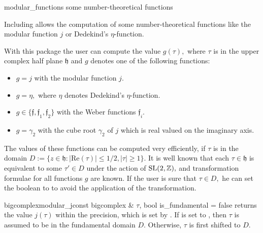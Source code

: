 

\NAME

modular\_functions \dotfill some number-theoretical functions



\ABSTRACT

Including  allows the computation of some
number-theoretical functions like the modular function $j$ or
Dedekind's $\eta$-function.



\DESCRIPTION

With this package the user can compute the
value $g(\tau),$ where $\tau$ is in the upper complex half plane
$\mathfrak{h}$ and $g$ denotes one of the following functions:

\begin{itemize}
\item $g=j$ with the modular function $j.$
\item $g=\eta,$ where $\eta$ denotes Dedekind's $\eta$-function.
\item $g\in\{\mathfrak{f},\mathfrak{f}_1,\mathfrak{f}_2\}$ with the
Weber functions $\mathfrak{f}_i.$
\item $g=\gamma_2$ with the cube root $\gamma_2$ of $j$ which is real
valued on the imaginary axis.
\end{itemize}

The values of these functions can be computed very efficiently, if
$\tau$ is in the domain
$D:=\{z\in\mathfrak{h}: |\mathrm{Re}(\tau)|\leq 1/2, |\tau|\geq 1\}.$
It is well known that each $\tau\in\mathfrak{h}$ is equivalent to some
$\tau'\in D$ under the action of $\mathrm{SL}(2,\mathbb{Z}),$
and transformation formulae for all functions $g$ are known. If
the user is sure that $\tau\in D,$ he can set the boolean
 to  to avoid the application
of the transformation.

\begin{fcode}{bigcomplex}{modular_j}{const bigcomplex & $\tau$, bool is_fundamental = false}
  returns the value $j(\tau)$ within the precision, which is set by
  . If  is set to
  , then $\tau$ is assumed to be in the fundamental domain $D.$
  Otherwise, $\tau$ is first shifted to $D.$
\end{fcode}

